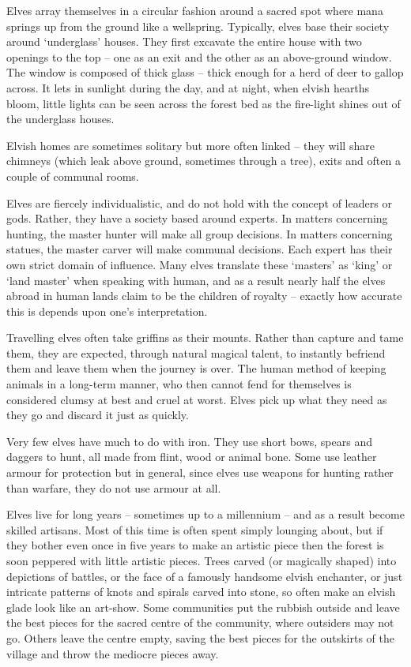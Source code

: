\begin{multicols}{2}

\noindent
Elves array themselves in a circular fashion around a sacred spot where mana springs up from the ground like a wellspring.
Typically, elves base their society around `underglass' houses. They first excavate the entire house with two openings to the top -- one as an exit and the other as an above-ground window. The window is composed of thick glass -- thick enough for a herd of deer to gallop across. It lets in sunlight during the day, and at night, when elvish hearths bloom, little lights can be seen across the forest bed as the fire-light shines out of the underglass houses.

Elvish homes are sometimes solitary but more often linked -- they will share chimneys (which leak above ground, sometimes through a tree), exits and often a couple of communal rooms.

Elves are fiercely individualistic, and do not hold with the concept of leaders or gods. Rather, they have a society based around experts. In matters concerning hunting, the master hunter will make all group decisions. In matters concerning statues, the master carver will make communal decisions. Each expert has their own strict domain of influence. Many elves translate these `masters' as `king' or `land master' when speaking with human, and as a result nearly half the elves abroad in human lands claim to be the children of royalty -- exactly how accurate this is depends upon one's interpretation.

Travelling elves often take griffins as their mounts. Rather than capture and tame them, they are expected, through natural magical talent, to instantly befriend them and leave them when the journey is over. The human method of keeping animals in a long-term manner, who then cannot fend for themselves is considered clumsy at best and cruel at worst. Elves pick up what they need as they go and discard it just as quickly.

Very few elves have much to do with iron. They use short bows, spears and daggers to hunt, all made from flint, wood or animal bone. Some use leather armour for protection but in general, since elves use weapons for hunting rather than warfare, they do not use armour at all.

Elves live for long years -- sometimes up to a millennium -- and as a result become skilled artisans.
Most of this time is often spent simply lounging about, but if they bother even once in five years to make an artistic piece then the forest is soon peppered with little artistic pieces.
Trees carved (or magically shaped) into depictions of battles, or the face of a famously handsome elvish enchanter, or just intricate patterns of knots and spirals carved into stone, so often make an elvish glade look like an art-show.
Some communities put the rubbish outside and leave the best pieces for the sacred centre of the community, where outsiders may not go.
Others leave the centre empty, saving the best pieces for the outskirts of the village and throw the mediocre pieces away.


\end{multicols}

